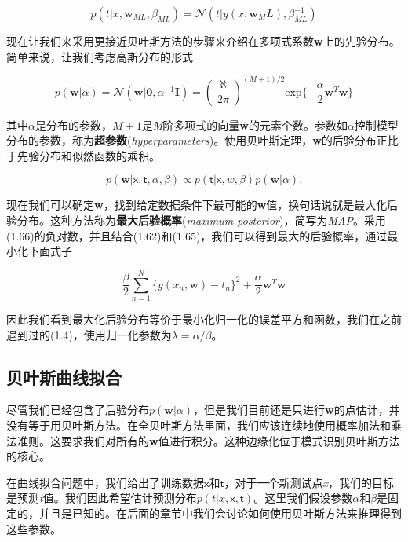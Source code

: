 	\begin{equation}
	p(t|x, \textbf{w}_{ML}, \beta_{ML}) = \mathcal{N}(t|y(x, \textbf{w}_ML), \beta_{ML}^{-1})
	\end{equation}
	
	现在让我们来采用更接近贝叶斯方法的步骤来介绍在多项式系数\textbf{w}上的先验分布。简单来说，让我们考虑高斯分布的形式
	
	\begin{equation}
	p(\textbf{w}|\alpha) = \mathcal{N}(\textbf{w}|\textbf{0}, \alpha^{-1}\textbf{I}) = (\frac{\aleph}{2 \pi})^{(M+1)/2} \mathrm{exp}\{ -\frac{\alpha}{2}\textbf{w}^T\textbf{w} \}
	\end{equation}
	
	其中$\alpha$是分布的参数，$M+1$是\textit{M}阶多项式的向量\textbf{w}的元素个数。参数如$\alpha$控制模型分布的参数，称为\textbf{超参数}(\textit{hyperparameters})。使用贝叶斯定理，\textbf{w}的后验分布正比于先验分布和似然函数的乘积。
	
	\begin{equation}
	p(\textbf{w}|\mathsf{x,t},\alpha, \beta) \propto p(\mathsf{t}|\mathsf{x}, w, \beta)p(\textbf{w}|\alpha).
	\end{equation}
	
	现在我们可以确定\textbf{w}，找到给定数据条件下最可能的\textbf{w}值，换句话说就是最大化后验分布。这种方法称为\textbf{最大后验概率}(\textit{maximum posterior})，简写为\textit{MAP}。采用(1.66)的负对数，并且结合(1.62)和(1.65)，我们可以得到最大的后验概率，通过最小化下面式子
	
	\begin{equation}
	\frac{\beta}{2} \sum_{n = 1}^{N} \{ y(x_n, \textbf{w}) - t_n \}^2 + \frac{\alpha}{2} \textbf{w}^T\textbf{w}
	\end{equation}  
	
	因此我们看到最大化后验分布等价于最小化归一化的误差平方和函数，我们在之前遇到过的(1.4)，使用归一化参数为$\lambda = \alpha / \beta$。
	
\subsection{贝叶斯曲线拟合}
	尽管我们已经包含了后验分布$p(\textbf{w}|\alpha)$，但是我们目前还是只进行\textbf{w}的点估计，并没有等于用贝叶斯方法。在全贝叶斯方法里面，我们应该连续地使用概率加法和乘法准则。这要求我们对所有的\textbf{w}值进行积分。这种边缘化位于模式识别贝叶斯方法的核心。
	
	在曲线拟合问题中，我们给出了训练数据$\mathsf{x}$和$\mathsf{t}$，对于一个新测试点\textit{x}，我们的目标是预测\textit{t}值。我们因此希望估计预测分布$p(t|x,\mathsf{x},\mathsf{t})$。这里我们假设参数$\alpha$和$\beta$是固定的，并且是已知的。在后面的章节中我们会讨论如何使用贝叶斯方法来推理得到这些参数。
	
